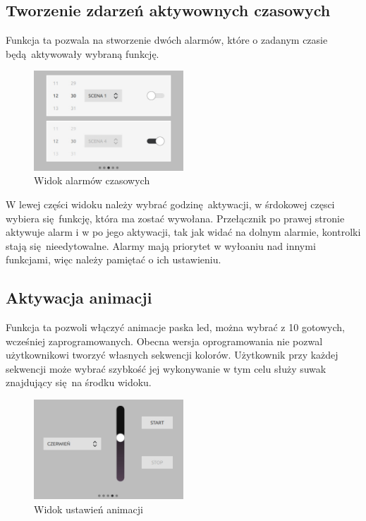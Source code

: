 \documentclass[12pt, eng, twoside, openany, final]{mgr}
\begin{document}
        \subsection{Tworzenie zdarzeń aktywownych czasowych}
        Funkcja ta pozwala na stworzenie dwóch alarmów, które o zadanym czasie będą aktywowały wybraną funkcję. 
            \begin{figure}[H]
            \begin{center}
                \includegraphics[width=0.5\textwidth]{ui_time.jpg}
                \caption{Widok alarmów czasowych}
            \end{center}
            \end{figure}
            
        W lewej części widoku należy wybrać godzinę aktywacji, w śrdokowej częsci wybiera się funkcję, która ma zostać wywołana. Przełącznik po prawej stronie aktywuje alarm i w po jego aktywacji, tak jak widać na dolnym alarmie, kontrolki stają się nieedytowalne. Alarmy mają priorytet w wyłoaniu nad innymi funkcjami, więc należy pamiętać o ich ustawieniu.
        
        \subsection{Aktywacja animacji}
        Funkcja ta pozwoli włączyć animacje paska led, można wybrać z 10 gotowych, wcześniej zaprogramowanych. Obecna wersja oprogramowania nie pozwal użytkownikowi tworzyć własnych sekwencji kolorów. Użytkownik przy każdej sekwencji może wybrać szybkość jej wykonywanie w tym celu służy suwak znajdujący się na środku widoku.
            \begin{figure}[H]
            \begin{center}
                \includegraphics[width=0.5\textwidth]{ui_animation.jpg}
                \caption{Widok ustawień animacji}
            \end{center}
            \end{figure}
        
\end{document}
